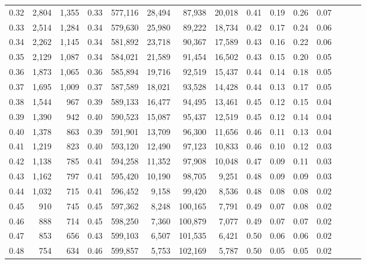 \begin{tabular}{rrrrrrrrrrrrrrr}
0.32 &   2,804 &  1,355 &  0.33 &  577,116 &   28,494 &   87,938 &   20,018 &  0.41 &  0.19 &  0.26 &      0.07 \\
0.33 &   2,514 &  1,284 &  0.34 &  579,630 &   25,980 &   89,222 &   18,734 &  0.42 &  0.17 &  0.24 &      0.06 \\
0.34 &   2,262 &  1,145 &  0.34 &  581,892 &   23,718 &   90,367 &   17,589 &  0.43 &  0.16 &  0.22 &      0.06 \\
0.35 &   2,129 &  1,087 &  0.34 &  584,021 &   21,589 &   91,454 &   16,502 &  0.43 &  0.15 &  0.20 &      0.05 \\
0.36 &   1,873 &  1,065 &  0.36 &  585,894 &   19,716 &   92,519 &   15,437 &  0.44 &  0.14 &  0.18 &      0.05 \\
0.37 &   1,695 &  1,009 &  0.37 &  587,589 &   18,021 &   93,528 &   14,428 &  0.44 &  0.13 &  0.17 &      0.05 \\
0.38 &   1,544 &    967 &  0.39 &  589,133 &   16,477 &   94,495 &   13,461 &  0.45 &  0.12 &  0.15 &      0.04 \\
0.39 &   1,390 &    942 &  0.40 &  590,523 &   15,087 &   95,437 &   12,519 &  0.45 &  0.12 &  0.14 &      0.04 \\
0.40 &   1,378 &    863 &  0.39 &  591,901 &   13,709 &   96,300 &   11,656 &  0.46 &  0.11 &  0.13 &      0.04 \\
0.41 &   1,219 &    823 &  0.40 &  593,120 &   12,490 &   97,123 &   10,833 &  0.46 &  0.10 &  0.12 &      0.03 \\
0.42 &   1,138 &    785 &  0.41 &  594,258 &   11,352 &   97,908 &   10,048 &  0.47 &  0.09 &  0.11 &      0.03 \\
0.43 &   1,162 &    797 &  0.41 &  595,420 &   10,190 &   98,705 &    9,251 &  0.48 &  0.09 &  0.09 &      0.03 \\
0.44 &   1,032 &    715 &  0.41 &  596,452 &    9,158 &   99,420 &    8,536 &  0.48 &  0.08 &  0.08 &      0.02 \\
0.45 &     910 &    745 &  0.45 &  597,362 &    8,248 &  100,165 &    7,791 &  0.49 &  0.07 &  0.08 &      0.02 \\
0.46 &     888 &    714 &  0.45 &  598,250 &    7,360 &  100,879 &    7,077 &  0.49 &  0.07 &  0.07 &      0.02 \\
0.47 &     853 &    656 &  0.43 &  599,103 &    6,507 &  101,535 &    6,421 &  0.50 &  0.06 &  0.06 &      0.02 \\
0.48 &     754 &    634 &  0.46 &  599,857 &    5,753 &  102,169 &    5,787 &  0.50 &  0.05 &  0.05 &      0.02 \\

\end{tabular}

